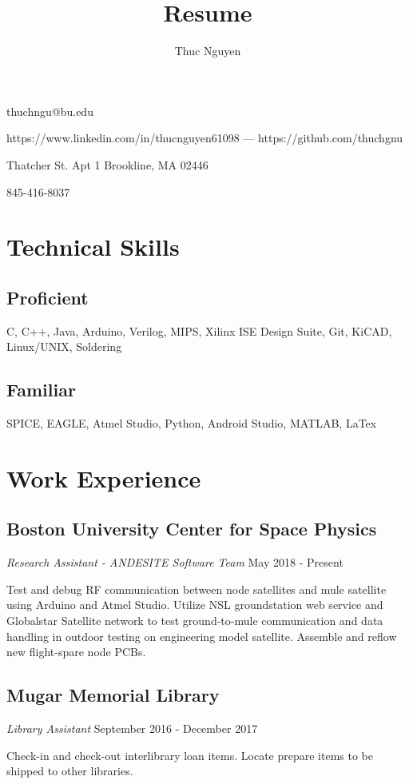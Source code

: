 \documentclass{article}
\makeatletter
\renewcommand{\maketitle}
{\begin{center}
{\huge\bfseries\theauthor}
\vspace{.5em}

thuchngu@bu.edu

https://www.linkedin.com/in/thucnguyen61098 --- https://github.com/thuchgnu

\end{center}}
\makeatother
\begin{document}
\title{Resume}
\author{Thuc Nguyen}
\maketitle
\vspace{-.5em}
{ Thatcher St. Apt 1 Brookline, MA 02446

845-416-8037

}
\vspace{-1.5em}
\section{Technical Skills}
\subsection{Proficient}
C, C++, Java, Arduino, Verilog, MIPS, Xilinx ISE Design Suite, Git, KiCAD, Linux/UNIX, Soldering
\vspace{-.75em}
\subsection{Familiar}
SPICE, EAGLE, Atmel Studio, Python, Android Studio, MATLAB, LaTex

\vspace{-.75em}
\section{Work Experience}
\subsection{Boston University Center for Space Physics}  \textit{Research Assistant - ANDESITE Software Team}
May 2018 - Present

Test and debug RF communication between node satellites and mule satellite using Arduino and Atmel Studio. Utilize NSL groundstation web service and Globalstar Satellite network to test ground-to-mule communication and data handling in outdoor testing on engineering model satellite. Assemble and reflow new flight-spare node PCBs.
\vspace{-.75em}
\subsection{Mugar Memorial Library} \textit{Library Assistant}
September 2016 - December 2017

Check-in and check-out interlibrary loan items. Locate prepare items to be shipped to other libraries.
\vspace{-.75em}
\end{document}
